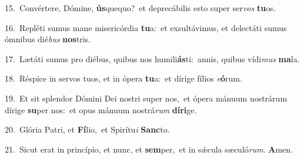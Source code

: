 {\numbfont\textcolor{\numbcolor}{15.}}~Convértere, Dómine, \textbf{ús}\-quequo?~\star et deprecábilis esto super ser\textit{vos} \textbf{tu}\-os.\par
{\numbfont\textcolor{\numbcolor}{16.}}~Repléti sumus mane misericórdia \textbf{tu}\-a:~\star et exsultávimus, et delectáti sumus ómnibus dié\textit{bus} \textbf{nos}\-tris.\par
{\numbfont\textcolor{\numbcolor}{17.}}~Lætáti sumus pro diébus, quibus nos humili\-\textbf{ás}\-ti:~\star annis, quibus vídi\textit{mus} \textbf{ma}\-la.\par
{\numbfont\textcolor{\numbcolor}{18.}}~Réspice in servos tuos, et in ópera \textbf{tu}\-a:~\star et dírige fílios \textit{e}\-\textbf{ó}rum.\par
{\numbfont\textcolor{\numbcolor}{19.}}~Et sit splendor Dómini Dei nostri super nos,~\dagger et ópera mánuum nostrárum dírige \textbf{su}\-per nos:~\star et opus mánuum nostrá\textit{rum} \textbf{dí}\-\textbf{ri}ge.\par
{\numbfont\textcolor{\numbcolor}{20.}}~Glória Patri, et \textbf{Fí}\-lio,~\star et Spirítu\textit{i} \textbf{Sanc}\-to.\par
{\numbfont\textcolor{\numbcolor}{21.}}~Sicut erat in princípio, et nunc, et \textbf{sem}\-per,~\star et in sǽcula sæculó\-\textit{rum}\-. \textbf{A}\-men.\par
